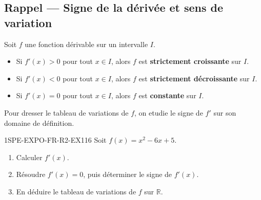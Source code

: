 

\subsection*{Rappel — Signe de la dérivée et sens de variation}

Soit $f$ une fonction dérivable sur un intervalle $I$.
\begin{itemize}
  \item Si $f'(x) > 0$ pour tout $x \in I$, alors $f$ est \textbf{strictement croissante} sur $I$.
  \item Si $f'(x) < 0$ pour tout $x \in I$, alors $f$ est \textbf{strictement décroissante} sur $I$.
  \item Si $f'(x) = 0$ pour tout $x \in I$, alors $f$ est \textbf{constante} sur $I$.
\end{itemize}

Pour dresser le tableau de variations de $f$, on etudie le signe de $f'$ sur son domaine de définition.


\begin{exercice}{1SPE-EXPO-FR-R2-EX1}{1}{6}
Soit $f(x) = x^2 - 6x + 5$.
\begin{enumerate}
  \item Calculer $f'(x)$.
  \item Résoudre $f'(x) = 0$, puis déterminer le signe de $f'(x)$.
  \item En déduire le tableau de variations de $f$ sur $\mathbb{R}$.
\end{enumerate}
\end{exercice}


